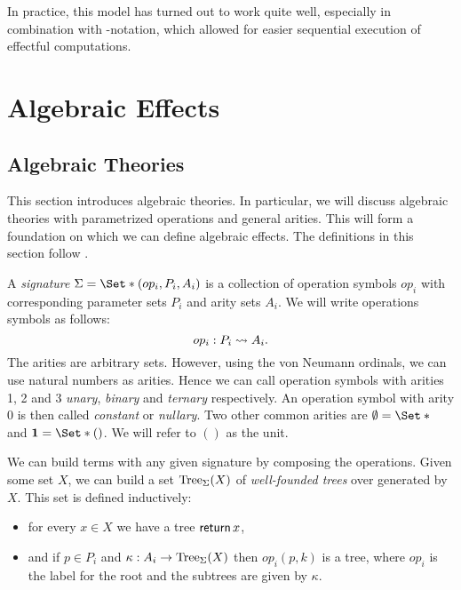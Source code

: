 In practice, this model has turned out to work quite well, especially in combination with -notation, which allowed for easier sequential execution of effectful computations.

\section{Algebraic Effects}\label{sec:alg}


\subsection{Algebraic Theories}

This section introduces algebraic theories. In particular, we will discuss algebraic theories with parametrized operations and general arities. This will form a foundation on which we can define algebraic effects. The definitions in this section follow \textcite{bauer_what_2018}.

\begin{definition}[Signature]
    A \emph{signature} $\Sig = \S{(op_i, P_i, A_i)}$ is a collection of operation symbols $op_i$ with corresponding parameter sets $P_i$ and arity sets $A_i$. We will write operations symbols as follows:
    \[ op_i : P_i \rightsquigarrow A_i. \]
    The arities are arbitrary sets. However, using the von Neumann ordinals, we can use natural numbers as arities. Hence we can call operation symbols with arities 1, 2 and 3 \emph{unary}, \emph{binary} and \emph{ternary} respectively. An operation symbol with arity $0$ is then called \emph{constant} or \emph{nullary}. Two other common arities are $\emptyset = \S{}$ and $\mathbf{1} = \S{()}$. We will refer to $()$ as the unit.
\end{definition}

We can build terms with any given signature by composing the operations. Given some set $X$, we can build a set $\operatorname{Tree}_\Sigma(X)$ of \emph{well-founded trees} over \Sig generated by $X$. This set is defined inductively:
\begin{itemize}
    \item for every $x\in X$ we have a tree $\operatorname{\mathsf{return}} x$,
    \item and if $p\in P_i$ and $\kappa : A_i \to \operatorname{Tree}_\Sigma(X)$ then $op_i(p,k)$ is a tree, where $op_i$ is the label for the root and the subtrees are given by $\kappa$.
\end{itemize}

